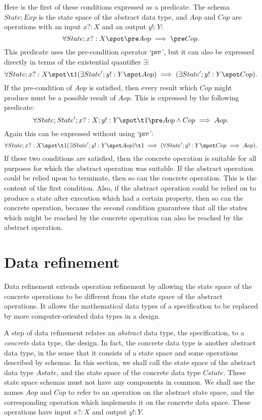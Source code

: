 Here is the first of these conditions expressed as a predicate. The
schema $State: Exp $ is the state space of the abstract data type, and $Aop$
and $Cop$ are operations with an input $x?: X$ and an output $y!: Y$:
\[ \forall State; x?: X \spot \pre Aop \implies \pre Cop. \]
This predicate uses the pre-condition operator `$\rm pre$', but it can also
be expressed directly in terms of the existential quantifier
$\exists$:
\[
	\forall State; x?: X \spot \\
\t1		(\exists State'; y!: Y \spot Aop) \implies
				(\exists State'; y!: Y \spot Cop).
\]
If the pre-condition of $Aop$ is satisfied, then every result which
$Cop$ might produce must be a possible result of $Aop$. This is
expressed by the following predicate:
\[
	\forall State; State'; x?: X; y!: Y \spot \\
\t1		\pre Aop \land Cop \implies Aop.
\]
Again this can be expressed without using `$\rm pre$':
\[
	\forall State; x?: X \spot \\
\t1	    (\exists State'; y!: Y \spot Aop) \\
\t1	    \implies (\forall State'; y!: Y \spot Cop \implies Aop).
\]
If these two conditions are satisfied, then the concrete operation is
suitable for all purposes for which the abstract operation was
suitable. If the abstract operation could be relied upon to terminate,
then so can the concrete operation.  This is the content of the first
condition. Also, if the abstract operation could be relied on to
produce a state after execution which had a certain property, then so
can the concrete operation, because the second condition guarantees
that all the states which might be reached by the concrete operation
can also be reached by the abstract operation.%

\section{Data refinement}\label{s:dataref}

Data refinement extends operation refinement
by allowing the state space of the concrete operations to be different
from the state space of the abstract operations.  It allows the
mathematical data types of a specification to be replaced by more
computer-oriented data types in a design.

A step of data refinement relates an {\em abstract\/} data type, the
specification, to a {\em concrete\/} data type, the design.  In fact,
the concrete data type is another abstract data type, in the sense
that it consists of a state space and some operations described by
schemas. In this section, we shall call the state space of the
abstract data type $Astate$, and the state space of the concrete data
type $Cstate$.  These state space schemas must not have any components
in common. We shall use the names $Aop$ and $Cop$ to refer to an
operation on the abstract state space, and the corresponding operation
which implements it on the concrete data space. These operations have
input $x?: X$ and output $y!: Y$.

